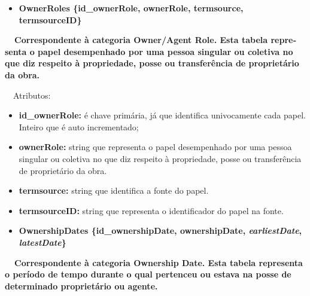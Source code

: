 \documentclass[letterpaper]{article}
\newcommand\textstyleStrongEmphasis[1]{\textbf{#1}}
\newcommand\liststyleLi{%
\renewcommand\labelitemi{{\textbullet}}
\renewcommand\labelitemii{[27A2?]}
\renewcommand\labelitemiii{{\textbullet}}
\renewcommand\labelitemiv{{\textbullet}}
}
\newcommand\liststyleLxiv{%
\renewcommand\labelitemi{[27A2?]}
\renewcommand\labelitemii{[27A2?]}
\renewcommand\labelitemiii{[27A2?]}
\renewcommand\labelitemiv{[27A2?]}
}
\begin{document}
\bigskip

\liststyleLi
\begin{itemize}
\item {\bfseries
OwnerRoles\textmd{ \{}\textmd{id\_ownerRole}\textmd{, ownerRole,
termsource, termsourceID\}}}
\end{itemize}
{\bfseries
\foreignlanguage{english}{\textmd{\ \ Correspondente \`a categoria
}}\foreignlanguage{english}{Owner}\textstyleStrongEmphasis{\foreignlanguage{english}{/Agent
Role}}\foreignlanguage{english}{\textmd{. Esta
}}\textstyleStrongEmphasis{\foreignlanguage{english}{\textmd{tabela}}}\foreignlanguage{english}{\textmd{
representa o papel desempenhado por uma pessoa singular ou coletiva no
que diz respeito \`a propriedade, posse ou transfer\^encia de
propriet\'ario da obra.}}}


\bigskip

{
\ \ Atributos:}

\liststyleLxiv
\begin{itemize}
\item {
\textbf{id\_ownerRole: }\'e chave prim\'aria, j\'a que identifica
univocamente cada papel. Inteiro que \'e auto incrementado;}
\item {
\textbf{ownerRole: }string que representa o papel desempenhado por uma
pessoa singular ou coletiva no que diz respeito \`a propriedade, posse
ou transfer\^encia de propriet\'ario da obra.}
\item {
\textbf{termsource: }string que identifica a fonte do papel.}
\item {
\textbf{termsourceID:} string que representa o identificador do papel na
fonte.}
\end{itemize}

\bigskip

\liststyleLi
\begin{itemize}
\item {\bfseries
OwnershipDates\textmd{ \{}\textmd{id\_ownershipDate}\textmd{,
ownershipDate, }\textmd{\textit{earliestDate}}\textmd{,
}\textmd{\textit{latestDate}}\textmd{\}}}
\end{itemize}
{\bfseries
\foreignlanguage{english}{\textmd{\ \ Correspondente \`a categoria
}}\foreignlanguage{english}{Ownership}\textstyleStrongEmphasis{\foreignlanguage{english}{
Date}}\foreignlanguage{english}{\textmd{. Esta
}}\textstyleStrongEmphasis{\foreignlanguage{english}{\textmd{tabela}}}\foreignlanguage{english}{\textmd{
representa o per\'iodo de tempo durante o qual pertenceu ou estava na
posse de determinado propriet\'ario ou agente.}}}
\end{document}
